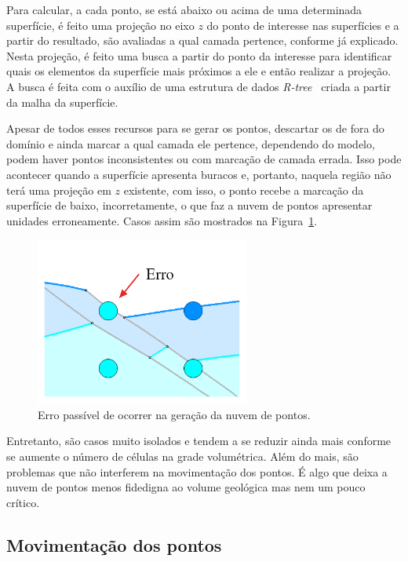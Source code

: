Para calcular, a cada ponto, se está abaixo ou acima de uma determinada superfície, é feito uma projeção no eixo $z$ do ponto de interesse nas superfícies e a partir do resultado, são avaliadas a qual camada pertence, conforme já explicado. Nesta projeção, é feito uma busca a partir do ponto da interesse para identificar quais os elementos da superfície mais próximos a ele e então realizar a projeção. A busca é feita com o auxílio de uma estrutura de dados \emph{R-tree}~\cite{RTree} criada a partir da malha da superfície.

Apesar de todos esses recursos para se gerar os pontos, descartar os de fora do domínio e ainda marcar a qual camada ele pertence, dependendo do modelo, podem haver pontos inconsistentes ou com marcação de camada errada. Isso pode acontecer quando a superfície apresenta buracos e, portanto, naquela região não terá uma projeção em $z$ existente, com isso, o ponto recebe a marcação da superfície de baixo, incorretamente, o que faz a nuvem de pontos apresentar unidades erroneamente. Casos assim são mostrados na Figura~\ref{fig-vol-errors}.

\begin{figure} [H]
  \begin{center}
    \includegraphics[width=200pt]{images/fig-vol-errors}
    \caption{Erro passível de ocorrer na geração da nuvem de pontos.}\label{fig-vol-errors}
  \end{center}
\end{figure}

Entretanto, são casos muito isolados e tendem a se reduzir ainda mais conforme se aumente o número de células na grade volumétrica. Além do mais, são problemas que não interferem na movimentação dos pontos. É algo que deixa a nuvem de pontos menos fidedigna ao volume geológica mas nem um pouco crítico.

\subsection{Movimentação dos pontos}

